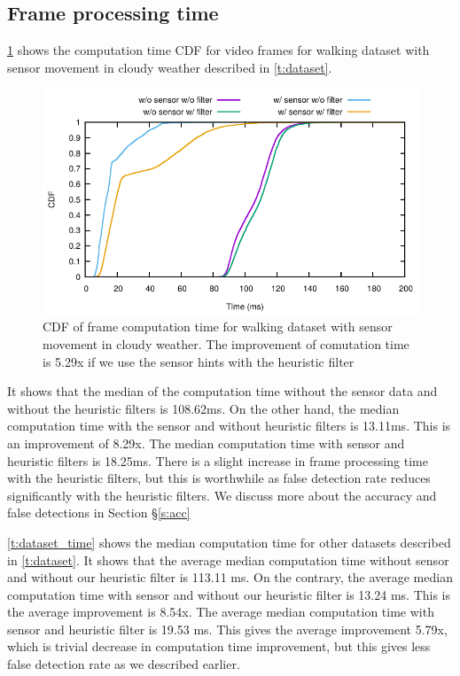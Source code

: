 \subsection{Frame processing time}
\ref{f:cdf_cloudy} shows the computation time CDF for video frames for walking dataset with sensor movement in cloudy weather described in \ref{t:dataset}.
\begin{figure}[ht]
\centering
\includegraphics[width=5.2in]{plots/cloudy_cdf.pdf}
\caption{CDF of frame computation time for walking dataset with sensor movement in cloudy weather. The improvement of comutation time is 5.29x if we use the sensor hints with the heuristic filter}
\label{f:cdf_cloudy}
\end{figure}
It shows that the median of the computation time without the sensor data and without the heuristic filters is 108.62ms.
On the other hand, the median computation time with the sensor and without heuristic filters is 13.11ms.
This is an improvement of 8.29x.
The median computation time with sensor and heuristic filters is 18.25ms.
There is a slight increase in frame processing time with the heuristic filters, but this is worthwhile as false detection rate reduces significantly with the heuristic filters.  
We discuss more about the accuracy and false detections in Section \S\ref{s:acc}

\ref{t:dataset_time} shows the median computation time for other datasets described in \ref{t:dataset}.
It shows that the average median computation time without sensor and without our heuristic filter is 113.11 ms.
On the contrary, the average median computation time with sensor and without our heuristic filter is 13.24 ms.
This is the average improvement is 8.54x.
The average median computation time with sensor and heuristic filter is 19.53 ms.
This gives the average improvement 5.79x, which is trivial decrease in computation time improvement, but this gives less false detection rate as we described earlier.

